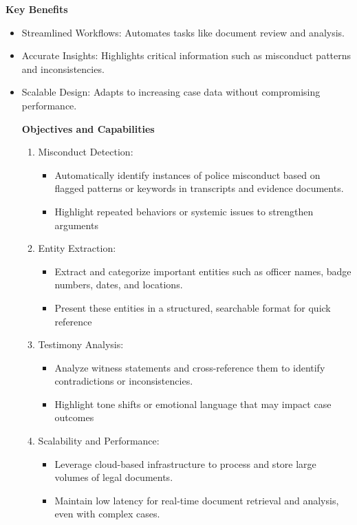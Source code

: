 \documentclass[12pt]{article}
\begin{document}
\textbf{Key Benefits }
\begin{itemize}
  \item  Streamlined Workflows: Automates tasks like document review and analysis.
  \item Accurate Insights: Highlights critical information such as misconduct patterns and
 inconsistencies.
  \item  Scalable Design: Adapts to increasing case data without compromising performance.

\textbf{Objectives and Capabilities }
\begin{enumerate}

    \item Misconduct Detection: 
	\begin{itemize}
	 	\item Automatically identify instances of police misconduct based on flagged patterns or
			 keywords in transcripts and evidence documents.
	 	\item  Highlight repeated behaviors or systemic issues to strengthen arguments
	\end{itemize}
    \item Entity  Extraction:
	\begin{itemize}
		 \item Extract and categorize important entities such as officer names, badge numbers, dates,
	 		and locations.
	 	\item Present these entities in a structured, searchable format for quick reference
	\end{itemize}
    \item Testimony Analysis:
	\begin{itemize}
		\item Analyze witness statements and cross-reference them to identify contradictions or
 			inconsistencies.
		\item  Highlight tone shifts or emotional language that may impact case outcomes
	\end{itemize}
    \item Scalability and Performance:
	\begin{itemize}
		\item  Leverage cloud-based infrastructure to process and store large volumes of legal
 			documents.
		\item Maintain low latency for real-time document retrieval and analysis, even with complex
  			cases.
	\end{itemize}
\end{enumerate}



\end{itemize}
\end{document}
